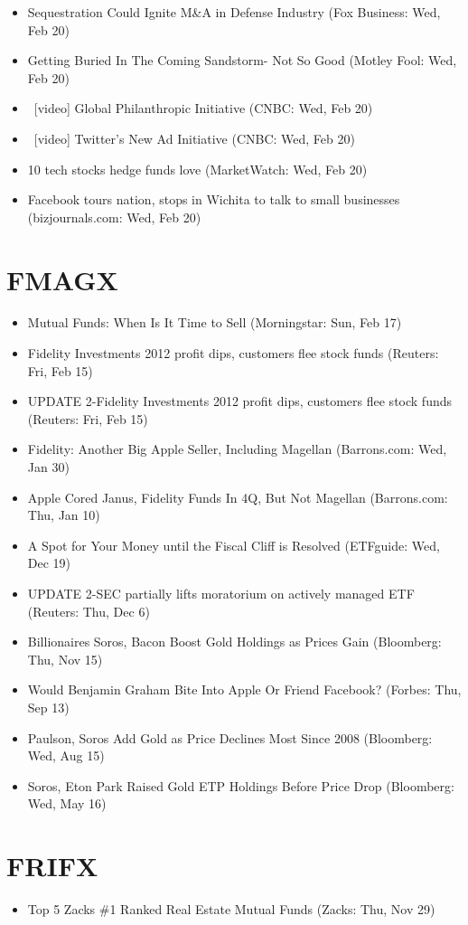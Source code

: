\documentclass[11pt,asymmetric]{article}
\begin{document}
\begin{itemize}
\item Sequestration Could Ignite M\&A in Defense Industry (Fox Business: Wed, Feb 20)
\item Getting Buried In The Coming Sandstorm- Not So Good (Motley Fool: Wed, Feb 20)
\item\ [video] Global Philanthropic Initiative (CNBC: Wed, Feb 20)
\item\ [video] Twitter's New Ad Initiative (CNBC: Wed, Feb 20)
\item 10 tech stocks hedge funds love (MarketWatch: Wed, Feb 20)
\item Facebook tours nation, stops in Wichita to talk to small businesses (bizjournals.com: Wed, Feb 20)
\end{itemize}

\section*{FMAGX}
\begin{itemize}
\item Mutual Funds: When Is It Time to Sell (Morningstar: Sun, Feb 17)
\item Fidelity Investments 2012 profit dips, customers flee stock funds (Reuters: Fri, Feb 15)
\item UPDATE 2-Fidelity Investments 2012 profit dips, customers flee stock funds (Reuters: Fri, Feb 15)
\item Fidelity: Another Big Apple Seller, Including Magellan (Barrons.com: Wed, Jan 30)
\item Apple Cored Janus, Fidelity Funds In 4Q, But Not Magellan (Barrons.com: Thu, Jan 10)
\item A Spot for Your Money until the Fiscal Cliff is Resolved (ETFguide: Wed, Dec 19)
\item UPDATE 2-SEC partially lifts moratorium on actively managed ETF (Reuters: Thu, Dec 6)
\item Billionaires Soros, Bacon Boost Gold Holdings as Prices Gain (Bloomberg: Thu, Nov 15)
\item Would Benjamin Graham Bite Into Apple Or Friend Facebook? (Forbes: Thu, Sep 13)
\item Paulson, Soros Add Gold as Price Declines Most Since 2008 (Bloomberg: Wed, Aug 15)
\item Soros, Eton Park Raised Gold ETP Holdings Before Price Drop (Bloomberg: Wed, May 16)
\end{itemize}

\section*{FRIFX}
\begin{itemize}
\item Top 5 Zacks \#1 Ranked Real Estate Mutual Funds (Zacks: Thu, Nov 29)
\end{itemize}
\end{document}
